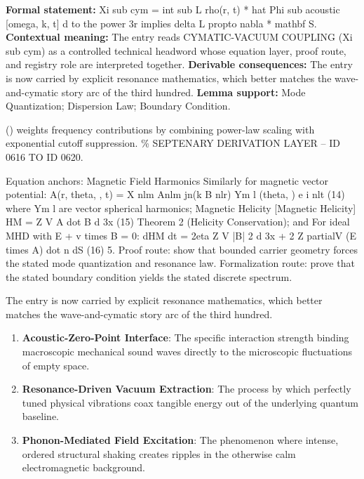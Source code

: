 \begingroup\footnotesize\setlength{\emergencystretch}{3em}\sloppy
\textbf{Formal statement:} Xi sub cym = int sub L rho(r, t) * hat Phi sub acoustic [omega, k, t] d to the power 3r implies delta L propto nabla * mathbf S. \textbf{Contextual meaning:} The entry reads CYMATIC-VACUUM COUPLING (Xi sub cym) as a controlled technical headword whose equation layer, proof route, and registry role are interpreted together. \textbf{Derivable consequences:} The entry is now carried by explicit resonance mathematics, which better matches the wave-and-cymatic story arc of the third hundred. \textbf{Lemma support:} Mode Quantization; Dispersion Law; Boundary Condition.\par
\endgroup

() weights frequency contributions by combining power-law scaling with exponential cutoff suppression. \% SEPTENARY DERIVATION LAYER -- ID 0616 TO ID 0620.

Equation anchors: Magnetic Field Harmonics Similarly for magnetic vector potential: A(r, theta,  , t) = X nlm Anlm jn(k B nlr) Ym l (theta,  ) e  i nlt (14) where Ym l are vector spherical harmonics; Magnetic Helicity [Magnetic Helicity] HM = Z V A dot B d 3x (15) Theorem 2 (Helicity Conservation); and For ideal MHD with E + v times B = 0: dHM dt =  2eta Z V |B| 2 d 3x + 2 Z partialV (E times A) dot n  dS (16) 5. Proof route: show that bounded carrier geometry forces the stated mode quantization and resonance law. Formalization route: prove that the stated boundary condition yields the stated discrete spectrum.

The entry is now carried by explicit resonance mathematics, which better matches the wave-and-cymatic story arc of the third hundred.
\endgroup

\begin{enumerate}[leftmargin=1.6em,itemsep=6pt,topsep=4pt]
\item \textbf{Acoustic-Zero-Point Interface}: The specific interaction strength binding macroscopic mechanical sound waves directly to the microscopic fluctuations of empty space.
\item \textbf{Resonance-Driven Vacuum Extraction}: The process by which perfectly tuned physical vibrations coax tangible energy out of the underlying quantum baseline.
\item \textbf{Phonon-Mediated Field Excitation}: The phenomenon where intense, ordered structural shaking creates ripples in the otherwise calm electromagnetic background.
\end{enumerate}

